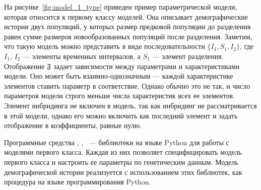 На рисунке~\ref{fig:model_1_type} приведен пример параметрической модели, которая относится к первому классу моделей.
Она описывает демографические истории двух популяций, у которых размер предковой популяции до разделения равен сумме размеров новообразованных популяций после разделения.
Заметим, что такую модель можно представить в виде последовательности $\{I_1, S_1, I_2\}$, где $I_1$, $I_2$ --- элементы временных интервалов, а $S_1$ --- элемент разделения.
Отображение $\mathfrak{F}$ задает зависимости между параметрами и характеристиками модели.
Оно может быть взаимно-однозначным --- каждой характеристике элементов ставить параметр в соответствие.
Однако обычно это не так, и число параметров модели строго меньше числа характеристик всех ее элементов.
Элемент инбридинга не включен в модель, так как инбридинг не рассматривается в этой модели, однако его можно включить как последний элемент и задать отображение в коэффициенты, равные нулю.



Программные средства \dadi, \moments, \momentsLD~--- библиотеки на языке Python для работы с моделями первого класса.
Каждая из них позволяет специфицировать модель первого класса и настроить ее параметры по генетическим данным.
Модель демографической истории реализуется с использованием этих библиотек, как процедура на языке программирования Python.

